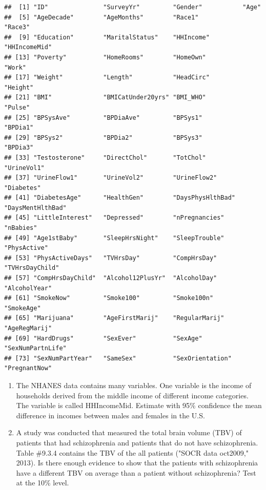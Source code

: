 \documentclass[
]{book}
\begin{document}
\begin{verbatim}
##  [1] "ID"               "SurveyYr"         "Gender"           "Age"             
##  [5] "AgeDecade"        "AgeMonths"        "Race1"            "Race3"           
##  [9] "Education"        "MaritalStatus"    "HHIncome"         "HHIncomeMid"     
## [13] "Poverty"          "HomeRooms"        "HomeOwn"          "Work"            
## [17] "Weight"           "Length"           "HeadCirc"         "Height"          
## [21] "BMI"              "BMICatUnder20yrs" "BMI_WHO"          "Pulse"           
## [25] "BPSysAve"         "BPDiaAve"         "BPSys1"           "BPDia1"          
## [29] "BPSys2"           "BPDia2"           "BPSys3"           "BPDia3"          
## [33] "Testosterone"     "DirectChol"       "TotChol"          "UrineVol1"       
## [37] "UrineFlow1"       "UrineVol2"        "UrineFlow2"       "Diabetes"        
## [41] "DiabetesAge"      "HealthGen"        "DaysPhysHlthBad"  "DaysMentHlthBad" 
## [45] "LittleInterest"   "Depressed"        "nPregnancies"     "nBabies"         
## [49] "Age1stBaby"       "SleepHrsNight"    "SleepTrouble"     "PhysActive"      
## [53] "PhysActiveDays"   "TVHrsDay"         "CompHrsDay"       "TVHrsDayChild"   
## [57] "CompHrsDayChild"  "Alcohol12PlusYr"  "AlcoholDay"       "AlcoholYear"     
## [61] "SmokeNow"         "Smoke100"         "Smoke100n"        "SmokeAge"        
## [65] "Marijuana"        "AgeFirstMarij"    "RegularMarij"     "AgeRegMarij"     
## [69] "HardDrugs"        "SexEver"          "SexAge"           "SexNumPartnLife" 
## [73] "SexNumPartYear"   "SameSex"          "SexOrientation"   "PregnantNow"
\end{verbatim}

\begin{enumerate}
\def\labelenumi{\arabic{enumi}.}
\setcounter{enumi}{1}
\item
  The NHANES data contains many variables. One variable is the income of households derived from the middle income of different income categories. The variable is called HHIncomeMid. Estimate with 95\% confidence the mean difference in incomes between males and females in the U.S.
\item
  A study was conducted that measured the total brain volume (TBV) of patients that had schizophrenia and patients that do not have schizophrenia. Table \#9.3.4 contains the TBV of the all patients ("SOCR data oct2009," 2013). Is there enough evidence to show that the patients with schizophrenia have a different TBV on average than a patient without schizophrenia? Test at the 10\% level.
\end{enumerate}
\end{document}
